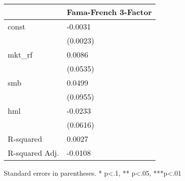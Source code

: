 \begin{table}
\caption{}
\label{}
\begin{center}
\begin{tabular}{ll}
\hline
               & Fama-French 3-Factor  \\
\hline
const          & -0.0031               \\
               & (0.0023)              \\
mkt\_rf        & 0.0086                \\
               & (0.0535)              \\
smb            & 0.0499                \\
               & (0.0955)              \\
hml            & -0.0233               \\
               & (0.0616)              \\
R-squared      & 0.0027                \\
R-squared Adj. & -0.0108               \\
\hline
\end{tabular}
\end{center}
\end{table}
\bigskip
Standard errors in parentheses. \newline 
* p<.1, ** p<.05, ***p<.01